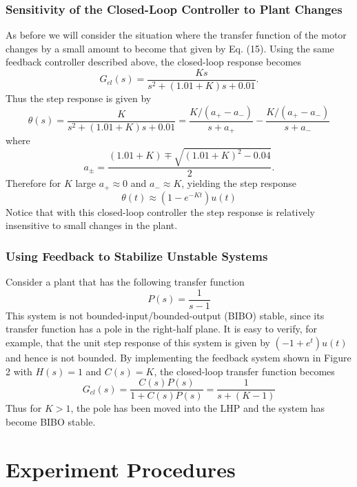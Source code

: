 \documentclass[a4paper]{article}
\begin{document}
\subsubsection{Sensitivity of the Closed-Loop Controller to Plant Changes}
As before we will consider the situation where the transfer function of the motor changes by a small amount to become that given by Eq. (15). Using the same feedback controller described above, the closed-loop response becomes
\begin{equation}
    G_{cl}(s)=\frac{Ks}{s^2+(1.01+K)s+0.01}.
\end{equation}
Thus the step response is given by
\begin{equation}
    \theta(s)=\frac{K}{s^2+(1.01+K)s+0.01}=\frac{K/(a_+-a_-)}{s+a_+}-\frac{K/(a_+-a_-)}{s+a_-}
\end{equation}
where
\begin{equation}
    a_\pm=\frac{(1.01+K)\mp\sqrt{(1.01+K)^2-0.04}}{2}.
\end{equation}
Therefore for $K$ large $a_+\approx0$ and $a_-\approx K$, yielding the step response
\begin{equation}
    \theta(t)\approx(1-e^{-Kt})u(t)
\end{equation}
Notice that with this closed-loop controller the step response is relatively insensitive to small changes in the plant.
\subsubsection{Using Feedback to Stabilize Unstable Systems}
Consider a plant that has the following transfer function
\begin{equation}
    P(s)=\frac{1}{s-1}
\end{equation}
This system is not bounded-input/bounded-output (BIBO) stable, since its transfer function has a pole in the right-half plane. It is easy to verify, for example, that the unit step response of this system is given by $(-1+e^t)u(t)$ and hence is not bounded. By implementing the feedback system shown in Figure 2 with $H(s)=1$ and $C(s)=K$, the closed-loop transfer function becomes
\begin{equation}
    G_{cl}(s)=\frac{C(s)P(s)}{1+C(s)P(s)}=\frac{1}{s+(K-1)}
\end{equation}
Thus for $K>1$, the pole has been moved into the LHP and the system has become BIBO stable.
\section{Experiment Procedures}
\end{document}
